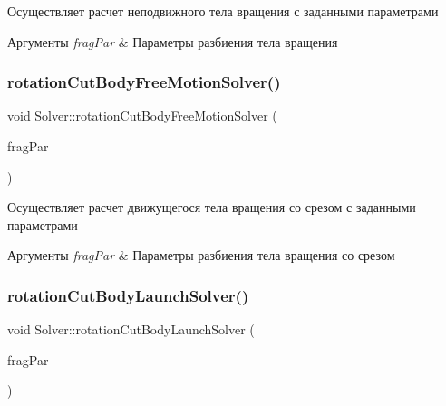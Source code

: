 Осуществляет расчет неподвижного тела вращения с заданными параметрами 
\begin{DoxyParams}{Аргументы}
{\em frag\+Par} & Параметры разбиения тела вращения \\
\hline
\end{DoxyParams}
\mbox{\label{class_solver_a3b238272aed6898fd756e15a41ea0109}} 
\subsubsection{\texorpdfstring{rotation\+Cut\+Body\+Free\+Motion\+Solver()}{rotationCutBodyFreeMotionSolver()}}
{\footnotesize\ttfamily void Solver\+::rotation\+Cut\+Body\+Free\+Motion\+Solver (\begin{DoxyParamCaption}\item[{const \mbox{\hyperlink{struct_fragmentation_parameters}{Fragmentation\+Parameters}} \&}]{frag\+Par }\end{DoxyParamCaption})}

Осуществляет расчет движущегося тела вращения со срезом с заданными параметрами 
\begin{DoxyParams}{Аргументы}
{\em frag\+Par} & Параметры разбиения тела вращения со срезом \\
\hline
\end{DoxyParams}
\mbox{\label{class_solver_a9c473ff1a6df13539a931cace5dfff45}} 
\subsubsection{\texorpdfstring{rotation\+Cut\+Body\+Launch\+Solver()}{rotationCutBodyLaunchSolver()}}
{\footnotesize\ttfamily void Solver\+::rotation\+Cut\+Body\+Launch\+Solver (\begin{DoxyParamCaption}\item[{const \mbox{\hyperlink{struct_fragmentation_parameters}{Fragmentation\+Parameters}} \&}]{frag\+Par }\end{DoxyParamCaption})}

